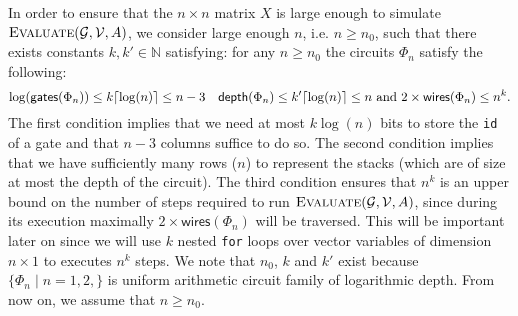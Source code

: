 In order to ensure that the $n\times n$ matrix $X$ is large enough to simulate $\textsc{Evaluate}(\mathcal{G},\mathcal{V},A)$, we consider large enough $n$, i.e. $n\geq n_0$, such that there exists constants $k,k'\in\mathbb{N}$ satisfying: for any $n\geq n_0$ the circuits $\Phi_n$ satisfy the following:
$$        \log(\mathsf{gates}(\Phi_n)) \leq k\lceil\log(n)\rceil\leq n-3 \quad  \mathsf{depth}(\Phi_n)\leq k' \lceil\log(n)\rceil \leq n       
		 \text{ and }
   2\times\mathsf{wires}(\Phi_n)\leq n^k.  
$$
The first condition implies that we need at most $k\log (n)$ bits to store the \texttt{id} of a gate and that $n-3$ columns suffice to do so.
The second condition implies that we have sufficiently many rows ($n$) to
represent the stacks (which are of size at most the depth of the circuit). The third condition ensures that $n^k$ is an upper bound on the number
of steps required to run $\textsc{Evaluate}(\mathcal{G},\mathcal{V},A)$, since during its execution maximally $2\times\mathsf{wires}(\Phi_n)$ will be traversed.
This will be important later on since we will use $k$ nested \texttt{for} loops over vector variables of dimension $n\times 1$ to executes $n^k$ steps.
We note that
$n_0$, $k$ and $k'$ exist because $\{\Phi_n\mid n=1,2, \}$ is  uniform arithmetic circuit family of logarithmic depth. From now on, we assume
that $n\geq n_0$. 


%

